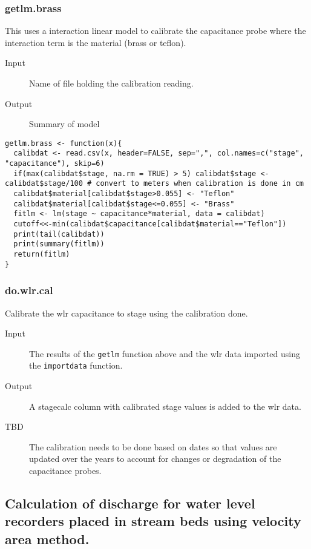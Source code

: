 \documentclass[a4paper]{article}
\begin{document}
\subsubsection*{getlm.brass}
\label{sec:org416c630}

This uses a interaction linear model to calibrate the capacitance probe where the interaction term is the material (brass or teflon).

\begin{description}
\item[{Input}] Name of file holding the calibration reading.
\item[{Output}] Summary of model
\end{description}

\begin{verbatim}
getlm.brass <- function(x){
  calibdat <- read.csv(x, header=FALSE, sep=",", col.names=c("stage", "capacitance"), skip=6)
  if(max(calibdat$stage, na.rm = TRUE) > 5) calibdat$stage <- calibdat$stage/100 # convert to meters when calibration is done in cm
  calibdat$material[calibdat$stage>0.055] <- "Teflon"
  calibdat$material[calibdat$stage<=0.055] <- "Brass"
  fitlm <- lm(stage ~ capacitance*material, data = calibdat)
  cutoff<<-min(calibdat$capacitance[calibdat$material=="Teflon"])
  print(tail(calibdat))
  print(summary(fitlm))
  return(fitlm)
}
\end{verbatim}

\subsubsection*{do.wlr.cal}
\label{sec:org1897c98}

Calibrate the wlr capacitance to stage using the calibration done.

\begin{description}
\item[{Input}] The results of the \texttt{getlm} function above and the wlr data imported using the \texttt{importdata} function.
\item[{Output}] A stagecalc column with calibrated stage values is added to the wlr data.
\item[{TBD}] The calibration needs to be done based on dates so that values are updated over the years to account for changes or degradation of the capacitance probes.
\end{description}

\subsection*{Calculation of discharge for water level recorders placed in stream beds using velocity area method.}
\label{sec:org3565a35}
\end{document}
